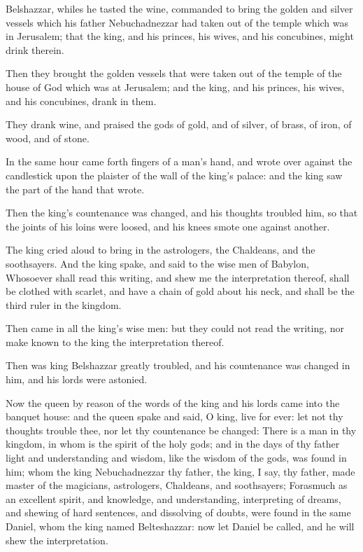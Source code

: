 \verse Belshazzar, whiles he tasted the wine, commanded to bring the golden and silver vessels which his father Nebuchadnezzar had taken out of the temple which was in Jerusalem; that the king, and his princes, his wives, and his concubines, might drink therein.

\verse Then they brought the golden vessels that were taken out of the temple of the house of God which was at Jerusalem; and the king, and his princes, his wives, and his concubines, drank in them.

\verse They drank wine, and praised the gods of gold, and of silver, of brass, of iron, of wood, and of stone.

\verse In the same hour came forth fingers of a man's hand, and wrote over against the candlestick upon the plaister of the wall of the king's palace: and the king saw the part of the hand that wrote.

\verse Then the king's countenance was changed, and his thoughts troubled him, so that the joints of his loins were loosed, and his knees smote one against another.

\verse The king cried aloud to bring in the astrologers, the Chaldeans, and the soothsayers. And the king spake, and said to the wise men of Babylon, Whosoever shall read this writing, and shew me the interpretation thereof, shall be clothed with scarlet, and have a chain of gold about his neck, and shall be the third ruler in the kingdom.

\verse Then came in all the king's wise men: but they could not read the writing, nor make known to the king the interpretation thereof.

\verse Then was king Belshazzar greatly troubled, and his countenance was changed in him, and his lords were astonied.

\verse Now the queen by reason of the words of the king and his lords came into the banquet house: and the queen spake and said, O king, live for ever: let not thy thoughts trouble thee, nor let thy countenance be changed: \verse There is a man in thy kingdom, in whom is the spirit of the holy gods; and in the days of thy father light and understanding and wisdom, like the wisdom of the gods, was found in him; whom the king Nebuchadnezzar thy father, the king, I say, thy father, made master of the magicians, astrologers, Chaldeans, and soothsayers; \verse Forasmuch as an excellent spirit, and knowledge, and understanding, interpreting of dreams, and shewing of hard sentences, and dissolving of doubts, were found in the same Daniel, whom the king named Belteshazzar: now let Daniel be called, and he will shew the interpretation.


